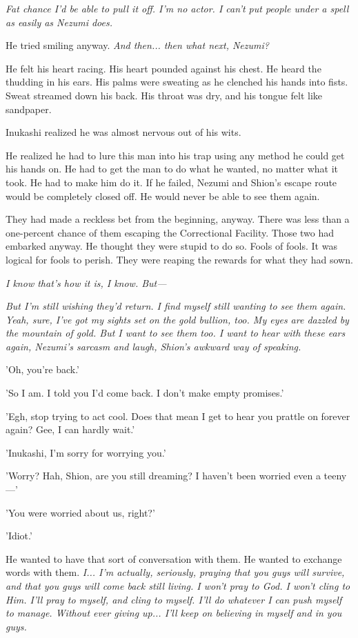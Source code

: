 \emph{Fat chance I'd be able to pull it off. I'm no actor. I can't put people
under a spell as easily as Nezumi does.}

He tried smiling anyway. \emph{And then... then what next, Nezumi?}

He felt his heart racing. His heart pounded against his chest. He heard
the thudding in his ears. His palms were sweating as he clenched his
hands into fists. Sweat streamed down his back. His throat was dry, and
his tongue felt like sandpaper.

Inukashi realized he was almost nervous out of his wits.

He realized he had to lure this man into his trap using any method he
could get his hands on. He had to get the man to do what he wanted, no
matter what it took. He had to make him do it. If he failed, Nezumi and
Shion's escape route would be completely closed off. He would never be
able to see them again.

They had made a reckless bet from the beginning, anyway. There was less
than a one-percent chance of them escaping the Correctional Facility.
Those two had embarked anyway. He thought they were stupid to do so.
Fools of fools. It was logical for fools to perish. They were reaping
the rewards for what they had sown.

\emph{I know that's how it is, I know. But---}

\emph{But I'm still wishing they'd return. I find myself still wanting to see
them again. Yeah, sure, I've got my sights set on the gold bullion, too.
My eyes are dazzled by the mountain of gold. But I want to see them too.
I want to hear with these ears again, Nezumi's sarcasm and laugh,
Shion's awkward way of speaking.}

'Oh, you're back.'

'So I am. I told you I'd come back. I don't make empty promises.'

'Egh, stop trying to act cool. Does that mean I get to hear you prattle
on forever again? Gee, I can hardly wait.'

'Inukashi, I'm sorry for worrying you.'

'Worry? Hah, Shion, are you still dreaming? I haven't been worried even
a teeny---'

'You were worried about us, right?'

'Idiot.'

He wanted to have that sort of conversation with them. He wanted to
exchange words with them. \emph{I... I'm actually, seriously, praying that you
guys will survive, and that you guys will come back still living. I
won't pray to God. I won't cling to Him. I'll pray to myself, and cling
to myself. I'll do whatever I can push myself to manage. Without ever
giving up... I'll keep on believing in myself and in you guys.}

